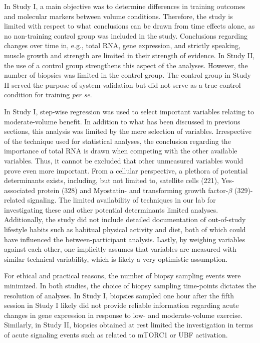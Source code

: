\documentclass[twoside,10pt]{gihclass} %
\begin{document}
In Study I, a main objective was to determine differences in training outcomes and molecular markers between volume conditions. Therefore, the study is limited with respect to what conclusions can be drawn from time effects alone, as no non-training control group was included in the study. Conclusions regarding changes over time in, e.g., total RNA, gene expression, and strictly speaking, muscle growth and strength are limited in their strength of evidence.
In Study II, the use of a control group strengthens this aspect of the analyses. However, the number of biopsies was limited in the control group. The control group in Study II served the purpose of system validation but did not serve as a true control condition for training \emph{per se}.

In Study I, step-wise regression was used to select important variables relating to moderate-volume benefit. In addition to what has been discussed in previous sections, this analysis was limited by the mere selection of variables. Irrespective of the technique used for statistical analyses, the conclusion regarding the importance of total RNA is drawn when competing with the other available variables. Thus, it cannot be excluded that other unmeasured variables would prove even more important.
From a cellular perspective, a plethora of potential determinants exists, including, but not limited to,
satellite cells (221),
Yes-associated protein (328) and
Myostatin- and transforming growth factor-\(\beta\) (329)-related signaling. The limited availability of techniques in our lab for investigating these and other potential determinants limited analyses.
Additionally, the study did not include detailed documentation of out-of-study lifestyle habits such as habitual physical activity and diet, both of which could have influenced the between-participant analysis.
Lastly, by weighing variables against each other, one implicitly assumes that variables are measured with similar technical variability, which is likely a very optimistic assumption.

For ethical and practical reasons, the number of biopsy sampling events were minimized. In both studies, the choice of biopsy sampling time-points dictates the resolution of analyses. In Study I, biopsies sampled one hour after the fifth session in Study I likely did not provide reliable information regarding acute changes in gene expression in response to low- and moderate-volume exercise. Similarly, in Study II, biopsies obtained at rest limited the investigation in terms of acute signaling events such as related to mTORC1 or UBF activation.
\end{document}

